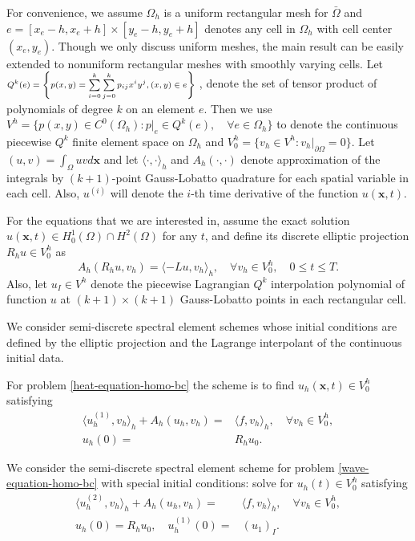 \documentclass[onefignum,onetabnum]{siamart171218}
\begin{document}
For convenience, we assume $\Omega_h$ is a uniform rectangular mesh for $\bar\Omega$ and $e=[x_e-h,x_e+h]\times [y_e-h,y_e+h]$ denotes any cell in $\Omega_h$ with  cell center $(x_e,y_e)$.  Though we only discuss uniform meshes, the main result can be easily extended to nonuniform rectangular meshes with smoothly varying cells.   Let $\mbox{\scriptsize $Q^k(e)=\left\{p(x,y)=\sum\limits_{i=0}^k\sum\limits_{j=0}^k p_{ij} x^iy^j,   (x,y)\in e\right\}$ }$,  denote  the set of 
 tensor product of polynomials of degree $k$ on  an element $e$. Then we use $V^h=\{p(x,y)\in C^0(\Omega_h): p|_e \in Q^{k}(e),\quad \forall e\in \Omega_h\}$ to denote the continuous piecewise $Q^{k}$ finite element space on $\Omega_h$ and $V^h_0=\{v_h\in V^h: v_h|_{\partial \Omega}=0 \}.$  Let $(u,v)=\int_\Omega u v d\mathbf x$  and let  $\langle \cdot, \cdot \rangle_h$ and $A_h(\cdot, \cdot)$ denote approximation of the integrals by $(k+1)$-point Gauss-Lobatto quadrature for each spatial variable in each cell. Also,  $u^{(i)}$ will denote the $i$-th time derivative of the function $u(\mathbf x,t)$.
 
 For  the   equations that we are interested in, assume the exact solution $u(\mathbf x,t)\in H_0^1(\Omega)\cap H^2(\Omega)$  for any $t$, and define its discrete elliptic projection $R_hu \in V^h_0$ as
\begin{equation}\label{elliptic-proj}
A_h(R_h u,v_h) = \langle -Lu,v_h \rangle_h,\quad \forall v_h\in V^h_0, \quad 0\leq t \leq T.
\end{equation}
 Also, let  $u_I \in V^h$ denote the piecewise Lagrangian $Q^k$ interpolation polynomial of function $u$ at $(k+1)\times(k+1)$ Gauss-Lobatto points in each rectangular cell.
 
We consider  semi-discrete spectral element schemes whose initial conditions are defined by the elliptic projection and the Lagrange interpolant of the continuous initial data. 

For problem \eqref{heat-equation-homo-bc} the scheme is 
to find $u_h(\mathbf x, t) \in V^h_0$ satisfying
\begin{equation}\label{heat-scheme}
\begin{aligned}
\langle u_h^{(1)}, v_h \rangle_h + A_h(u_h, v_h) = & \langle f, v_h \rangle_h,\quad  \forall v_h \in V^h_0, \\
u_h(0) = & R_hu_0.
\end{aligned}
\end{equation} 

We consider the semi-discrete  spectral element scheme for problem \eqref{wave-equation-homo-bc} with special initial conditions: solve for $u_h( t) \in V^h_0$ satisfying
\begin{equation}\label{wave-scheme}
\begin{aligned}
\langle u_h^{(2)}, v_h \rangle_h + A_h(u_h, v_h) = & \langle f, v_h \rangle_h,\quad  \forall v_h \in V^h_0,\\
u_h(0) = R_hu_0, \quad u_h^{(1)}(0) = & (u_1)_I.
\end{aligned}
\end{equation}
 
\end{document}
